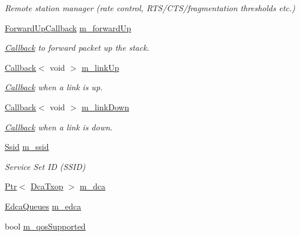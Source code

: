 \begin{DoxyCompactItemize}
\begin{DoxyCompactList}\small\item\em Remote station manager (rate control, R\+T\+S/\+C\+T\+S/fragmentation thresholds etc.) \end{DoxyCompactList}\item 
\hyperlink{classns3_1_1RegularWifiMac_a7f9bf4f4f1fc2514fcbf651015929225}{Forward\+Up\+Callback} \hyperlink{classns3_1_1RegularWifiMac_a8ebd1a94f84014418fc3b04d2ea36aaa}{m\+\_\+forward\+Up}
\begin{DoxyCompactList}\small\item\em \hyperlink{classns3_1_1Callback}{Callback} to forward packet up the stack. \end{DoxyCompactList}\item 
\hyperlink{classns3_1_1Callback}{Callback}$<$ void $>$ \hyperlink{classns3_1_1RegularWifiMac_aed501c39503c91f613c3e85d444c1729}{m\+\_\+link\+Up}
\begin{DoxyCompactList}\small\item\em \hyperlink{classns3_1_1Callback}{Callback} when a link is up. \end{DoxyCompactList}\item 
\hyperlink{classns3_1_1Callback}{Callback}$<$ void $>$ \hyperlink{classns3_1_1RegularWifiMac_a4951247f850b30e1367565ebeb2999e5}{m\+\_\+link\+Down}
\begin{DoxyCompactList}\small\item\em \hyperlink{classns3_1_1Callback}{Callback} when a link is down. \end{DoxyCompactList}\item 
\hyperlink{classns3_1_1Ssid}{Ssid} \hyperlink{classns3_1_1RegularWifiMac_ad641a8ee4b572b76198fc6cd408ada61}{m\+\_\+ssid}
\begin{DoxyCompactList}\small\item\em Service Set ID (S\+S\+ID) \end{DoxyCompactList}\item 
\hyperlink{classns3_1_1Ptr}{Ptr}$<$ \hyperlink{classns3_1_1DcaTxop}{Dca\+Txop} $>$ \hyperlink{classns3_1_1RegularWifiMac_a152965c3def1a308b088b37c2c88a1a2}{m\+\_\+dca}
\item 
\hyperlink{classns3_1_1RegularWifiMac_af5fd1332c45fb685ed18480b8f73d6b8}{Edca\+Queues} \hyperlink{classns3_1_1RegularWifiMac_ac750365ab3708902cc0b7700164c706d}{m\+\_\+edca}
\item 
bool \hyperlink{classns3_1_1RegularWifiMac_aeecdb918687493a8efdd70304bc0cee9}{m\+\_\+qos\+Supported}
\item 

\end{DoxyCompactItemize}
